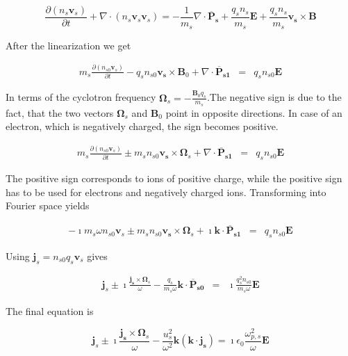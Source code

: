 \documentclass[a4paper,11pt]{thesis}
\begin{document}
\begin{equation}
     \frac{\partial (n_s \mathbf{v}_s)}{\partial t}+ \nabla \cdot
     (n_s \mathbf{v}_s  \mathbf{v}_s) = -\frac{1}{m_s}\nabla \cdot
     \mathbf{\overline{P}_s} + \frac{q_s n_s}{m_s} \mathbf{E}+\frac{q_s n_s}
     {m_s}\mathbf{v_s}\times \mathbf{B}
\end{equation}


After the linearization we get

\begin{eqnarray}
     m_s \frac{\partial (n_{s0} \mathbf{v}_s)}{\partial t}  - q_s n_{s0}
     \mathbf{v_s}\times \mathbf{B}_0+\nabla \cdot
     \mathbf{\overline{P}_{s1}} &=& q_s n_{s0} \mathbf{E}
\end{eqnarray}

In terms of the cyclotron frequency $\mathbf{\Omega}_s=-\frac{\mathbf{B}_0 q_s}{m_s}$.The negative sign is due to the fact, that the two vectors $\mathbf{\Omega}_s$ and $\mathbf{B}_0$ point in opposite directions. In case of an electron, which is negatively charged, the sign becomes positive.

\begin{eqnarray}
     m_s \frac{\partial (n_{s0} \mathbf{v}_s)}{\partial t}  \pm m_s n_{s0}
     \mathbf{v_s}\times \mathbf{\Omega}_s+\nabla \cdot
     \mathbf{\overline{P}_{s1}} &=& q_s n_{s0} \mathbf{E}
\end{eqnarray}

The positive sign corresponds to ions of positive charge, while the positive sign has to be used for electrons and negatively charged ions. Transforming into Fourier space yields

\begin{eqnarray}
     - \imath m_s \omega n_{s0} \mathbf{v}_s  \pm m_s n_{s0}
     \mathbf{v_s}\times \mathbf{\Omega}_s+ \imath \mathbf{k} \cdot
     \mathbf{\overline{P}_{s1}} &=& q_s n_{s0} \mathbf{E}
\end{eqnarray}

Using $\mathbf{j}_s=n_{s0} q_s \mathbf{v}_s$ gives

\begin{eqnarray}
      \mathbf{j}_s \pm \imath
    \frac{ \mathbf{j_s}\times \mathbf{\Omega}_s}{\omega} -  \frac{q_s}{ m_s \omega} \mathbf{k} \cdot
     \mathbf{\overline{P}_{s0}} &=& \imath \frac{q_s^2 n_{s0}}{ m_s \omega} \mathbf{E}
\end{eqnarray}

The final equation is

\begin{equation}
      \mathbf{j}_s  \pm \imath
    \frac{ \mathbf{j_s} \times \mathbf{\Omega}_s }{\omega}-  \frac{u_s^2 }{  \omega^2} \mathbf{k}(\mathbf{k} \cdot  \mathbf{j_s})
     = \imath \epsilon_0 \frac{\omega_{p,s}^2}{  \omega} \mathbf{E}
\end{equation}
\end{document}

